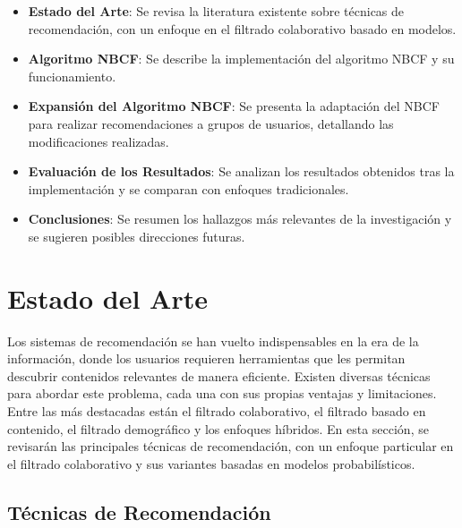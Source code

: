 \documentclass[twocolumn, fontsize=10pt]{article}
\begin{document}
\begin{itemize} 
    \item \textbf{Estado del Arte}: Se revisa la literatura existente sobre técnicas de recomendación, con un enfoque en el filtrado colaborativo basado en modelos. 
    \item \textbf{Algoritmo NBCF}: Se describe la implementación del algoritmo NBCF y su funcionamiento. 
    \item \textbf{Expansión del Algoritmo NBCF}: Se presenta la adaptación del NBCF para realizar recomendaciones a grupos de usuarios, detallando las modificaciones realizadas. 
    \item \textbf{Evaluación de los Resultados}: Se analizan los resultados obtenidos tras la implementación y se comparan con enfoques tradicionales. 
    \item \textbf{Conclusiones}: Se resumen los hallazgos más relevantes de la investigación y se sugieren posibles direcciones futuras. 
\end{itemize}

\section{Estado del Arte}

Los sistemas de recomendación se han vuelto 
indispensables en la era de la información, 
donde los usuarios requieren herramientas que les 
permitan descubrir contenidos relevantes de manera 
eficiente. Existen diversas técnicas para abordar 
este problema, cada una con sus propias ventajas y 
limitaciones. Entre las más destacadas están el 
filtrado colaborativo, el filtrado basado en contenido, 
el filtrado demográfico y los enfoques híbridos. 
En esta sección, se revisarán las principales técnicas 
de recomendación, con un enfoque particular en el 
filtrado colaborativo y sus variantes basadas en 
modelos probabilísticos.

\subsection{Técnicas de Recomendación}
\end{document}
